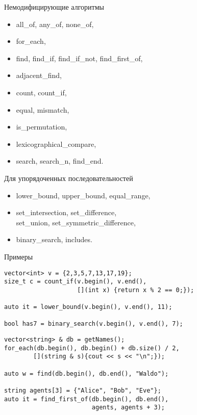 \documentclass[aspectration=1610,t]{beamer}
\begin{document}
\begin{frame}[fragile]{Немодифицирующие алгоритмы}
\begin{itemize}
    \tt
    \item all\_of, any\_of, none\_of,
    \item for\_each,
    \item find, find\_if, find\_if\_not, find\_first\_of,
    \item adjacent\_find,
    \item count, count\_if,
    \item equal, mismatch,
    \item is\_permutation,
    \item lexicographical\_compare,
    \item search, search\_n, find\_end.
\end{itemize}    

\begin{block}{Для упорядоченных последовательностей}
\begin{itemize}
    \tt
    \item lower\_bound, upper\_bound, equal\_range,
    \item set\_intersection, set\_difference,\\set\_union, set\_symmetric\_difference,
    \item binary\_search, includes.
\end{itemize}
\end{block}
\end{frame}

\begin{frame}[fragile]{Примеры}
\begin{lstlisting}
vector<int> v = {2,3,5,7,13,17,19};
size_t c = count_if(v.begin(), v.end(),
                    [](int x) {return x % 2 == 0;});
                    
auto it = lower_bound(v.begin(), v.end(), 11);

bool has7 = binary_search(v.begin(), v.end(), 7);
\end{lstlisting}
\begin{lstlisting}
vector<string> & db = getNames();
for_each(db.begin(), db.begin() + db.size() / 2, 
        [](string & s){cout << s << "\n";});

auto w = find(db.begin(), db.end(), "Waldo");

string agents[3] = {"Alice", "Bob", "Eve"};
auto it = find_first_of(db.begin(), db.end(), 
                        agents, agents + 3);
\end{lstlisting}
\end{frame}
\end{document}
